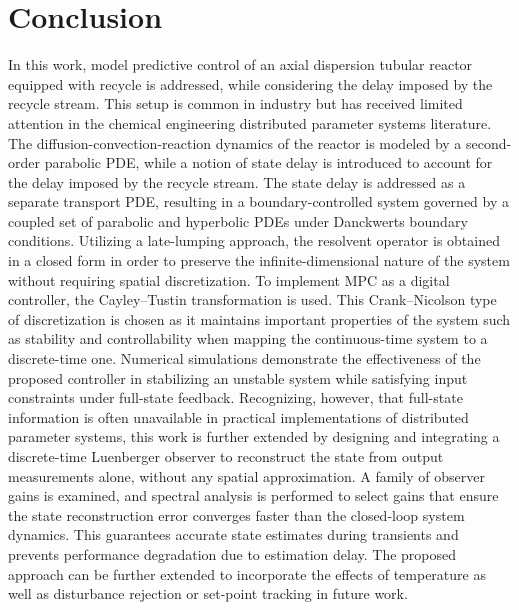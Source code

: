 \section{Conclusion} \label{sec:conclusion}

In this work, model predictive control of an axial dispersion tubular reactor equipped with recycle is addressed, while considering the delay imposed by the recycle stream. This setup is common in industry but has received limited attention in the chemical engineering distributed parameter systems literature. The diffusion-convection-reaction dynamics of the reactor is modeled by a second-order parabolic PDE, while a notion of state delay is introduced to account for the delay imposed by the recycle stream. The state delay is addressed as a separate transport PDE, resulting in a boundary-controlled system governed by a coupled set of parabolic and hyperbolic PDEs under Danckwerts boundary conditions. Utilizing a late-lumping approach, the resolvent operator is obtained in a closed form in order to preserve the infinite-dimensional nature of the system without requiring spatial discretization. To implement MPC as a digital controller, the Cayley–Tustin transformation is used. This Crank–Nicolson type of discretization is chosen as it maintains important properties of the system such as stability and controllability when mapping the continuous-time system to a discrete-time one. Numerical simulations demonstrate the effectiveness of the proposed controller in stabilizing an unstable system while satisfying input constraints under full-state feedback. Recognizing, however, that full-state information is often unavailable in practical implementations of distributed parameter systems, this work is further extended by designing and integrating a discrete-time Luenberger observer to reconstruct the state from output measurements alone, without any spatial approximation. A family of observer gains is examined, and spectral analysis is performed to select gains that ensure the state reconstruction error converges faster than the closed-loop system dynamics. This guarantees accurate state estimates during transients and prevents performance degradation due to estimation delay. The proposed approach can be further extended to incorporate the effects of temperature as well as disturbance rejection or set-point tracking in future work.